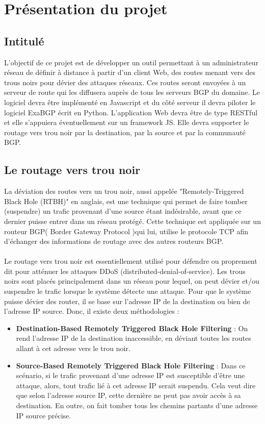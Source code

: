 \section{Présentation du projet}
\subsection{Intitulé}
 L'objectif de ce projet est de développer un outil permettant à un administrateur réseau de définir à distance à partir d'un client Web, des routes menant vers des trous noirs pour dévier des attaques réseaux. Ces routes seront envoyées à un serveur de route qui les diffusera auprès de tous les serveurs BGP du domaine. Le logiciel devra être implémenté en Javascript et du côté serveur il devra piloter le logiciel ExaBGP écrit en Python. L'application Web devra être de type RESTful et elle s'appuiera éventuellement sur un framework JS. Elle devra supporter le routage vers trou noir par la destination, par la source et par la communauté BGP.


\subsection{Le routage vers trou noir \cite{Cisco}} 

La déviation des routes vers un trou noir, aussi appelée "Remotely-Triggered Black Hole (RTBH)" en anglais, est une technique qui permet de faire tomber (suspendre) un trafic provenant d'une source étant indésirable, avant que ce dernier puisse entrer dans un réseau protégé.
\newline
Cette technique est appliquée sur un routeur BGP( Border Gateway Protocol )qui lui, utilise le protocole TCP afin d'échanger des informations de routage avec des autres routeurs BGP.
\\
\\
Le routage vers trou noir est essentiellement utilisé pour défendre ou proprement dit pour atténuer les attaques DDoS (distributed-denial-of-service). Les trous noirs sont placés principalement dans un réseau pour lequel, on peut dévier et/ou suspendre le trafic lorsque le système détecte une attaque. 
\newline
Pour que le système puisse dévier des router, il se base sur l'adresse IP de la destination ou bien de l'adresse IP source. Donc, il existe deux méthodologies :
\\
\begin{itemize}
\item \textbf{Destination-Based Remotely Triggered Black Hole Filtering } : On rend l'adresse IP de la destination inaccessible, en déviant toutes les routes allant à cet adresse vers le trou noir.
\item \textbf{Source-Based Remotely Triggered Black Hole Filtering }
: Dans ce scénario, si le trafic provenant d'une adresse IP est susceptible d'être une attaque, alors, tout trafic lié à cet adresse IP serait suspendu. Cela veut dire que selon l'adresse source IP, cette dernière ne peut pas avoir accès à sa destination. En outre, on fait tomber tous les chemins partants d'une adresse IP source précise.   
\end{itemize}


